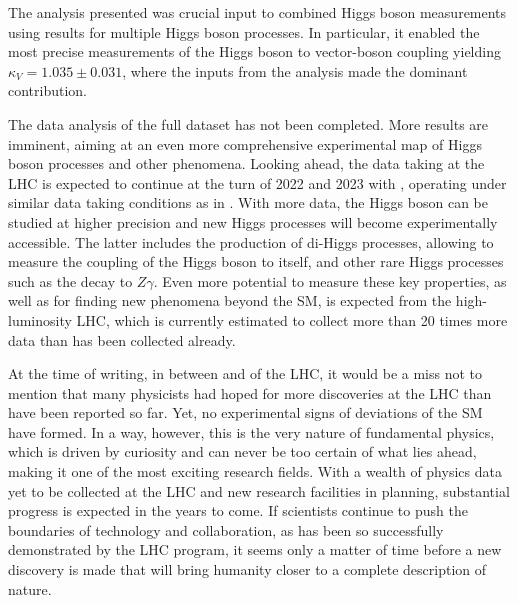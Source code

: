 The analysis presented was crucial input to combined Higgs boson measurements using results for multiple Higgs boson processes. 
In particular, it enabled the most precise measurements of the Higgs boson to vector-boson coupling yielding $\kappa_V = 1.035 \pm 0.031$, where the inputs from the \HWWdet analysis made the dominant contribution. 

The data analysis of the full \RunTwo dataset has not been completed. 
More results are imminent, aiming at an even more comprehensive experimental map of Higgs boson processes and other phenomena. 
Looking ahead, the data taking at the LHC is expected to continue at the turn of 2022 and 2023 with \RunThr, operating under similar data taking conditions as in \RunTwo. 
With more data, the Higgs boson can be studied at higher precision and new Higgs processes will become experimentally accessible. The latter includes the production of di-Higgs processes, allowing to measure the coupling of the Higgs boson to itself, and other rare Higgs processes such as the decay to $Z\gamma$. 
Even more potential to measure these key properties, as well as for finding new phenomena beyond the SM, is expected from the high-luminosity LHC, which is currently estimated to collect more than 20 times more data than has been collected already. 


At the time of writing, in between \RunTwo and \RunThr of the LHC, it would be a miss not to mention that many physicists had hoped for more discoveries at the LHC than have been reported so far. 
Yet, no experimental signs of deviations of the SM have formed.
In a way, however, this is the very nature of fundamental physics, which is driven by curiosity and can never be too certain of what lies ahead, making it one of the most exciting research fields. 
With a wealth of physics data yet to be collected at the LHC and new research facilities in planning, substantial progress is expected in the years to come. If scientists continue to push the boundaries of technology and collaboration, as has been so successfully demonstrated by the LHC program, it seems only a matter of time before a new discovery is made that will bring humanity closer to a complete description of nature. 


